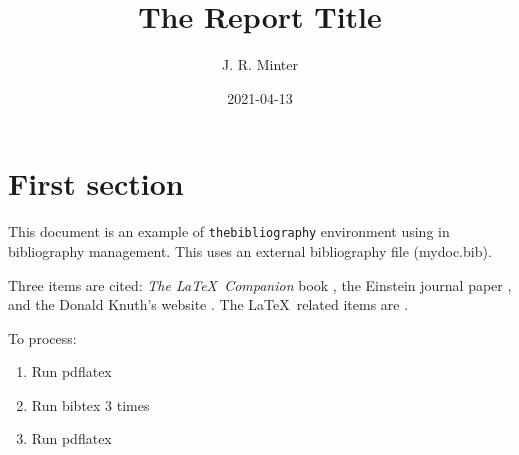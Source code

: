\documentclass[12pt]{article}
\title{The Report Title}
\author{J. R. Minter}
\date{2021-04-13}
\begin{document}
\maketitle
\nocite{*}

\section{First section}

This document is an example of \texttt{thebibliography} environment using 
in bibliography management. This uses an external bibliography file (mydoc.bib).



Three items are cited: \textit{The \LaTeX\ Companion} 
book \cite{latexcompanion}, the Einstein journal paper \cite{einstein}, and the 
Donald Knuth's website \cite{knuthwebsite}. The \LaTeX\ related items are
\cite{latexcompanion,knuthwebsite}. 

To process:
\begin{enumerate}
    \item Run pdflatex
    \item Run bibtex 3 times
    \item Run pdflatex
\end{enumerate}


\medskip

\raggedright

\end{document}

